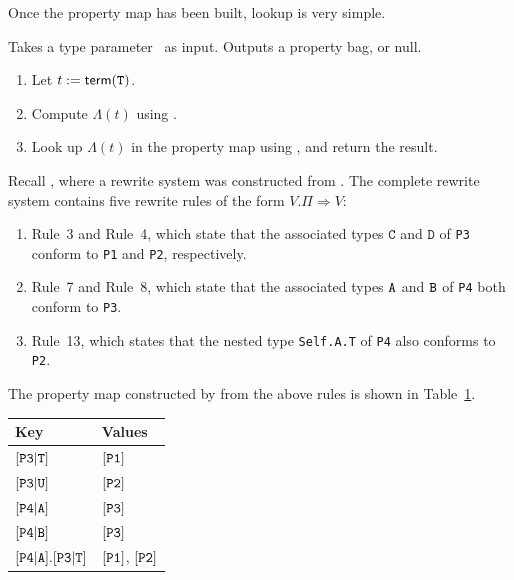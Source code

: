 \documentclass[../generics]{subfiles}
\begin{document}
Once the property map has been built, lookup is very simple.

\begin{algorithm}\label{alg:look up property}
Takes a type parameter \tT\ as input. Outputs a property bag, or null.
\begin{enumerate}
\item Let $t := \mathsf{term}(\texttt{T})$.
\item Compute $\Lambda(t)$ using .
\item Look up $\Lambda(t)$ in the property map using , and return the result.
\end{enumerate}
\end{algorithm}

\begin{example}\label{propmapexample2}
Recall , where a rewrite system was constructed from . The complete rewrite system contains five rewrite rules of the form $V.\Pi\Rightarrow V$:
\begin{enumerate}
\item Rule~3 and Rule~4, which state that the associated types $\texttt{C}$ and $\texttt{D}$ of \texttt{P3} conform to \texttt{P1} and \texttt{P2}, respectively.
\item Rule~7 and Rule~8, which state that the associated types $\texttt{A}$ and $\texttt{B}$ of \texttt{P4} both conform to \texttt{P3}.
\item Rule~13, which states that the nested type \texttt{Self.A.T} of \texttt{P4} also conforms to \texttt{P2}.
\end{enumerate}
The property map constructed by  from the above rules is shown in Table~\ref{propmapexample2table}.
\end{example}
\begin{table}\label{propmapexample2table}
\begin{center}
\begin{tabular}{|l|l|}
\hline
Key&Values\\
\hline
\hline
$[\texttt{P3}|\texttt{T}]$&$[\texttt{P1}]$\\
$[\texttt{P3}|\texttt{U}]$&$[\texttt{P2}]$\\
$[\texttt{P4}|\texttt{A}]$&$[\texttt{P3}]$\\
$[\texttt{P4}|\texttt{B}]$&$[\texttt{P3}]$\\
$[\texttt{P4}|\texttt{A}].[\texttt{P3}|\texttt{T}]$&$[\texttt{P1}]$, $[\texttt{P2}]$\\
\hline
\end{tabular}
\end{center}
\end{table}
\end{document}
